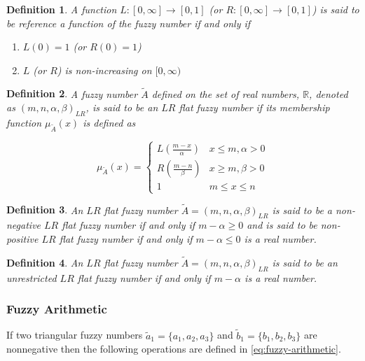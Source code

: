 \documentclass[ee,msthesis]{usuthesis}
\newtheorem{definition}{Definition}[section]
\begin{document}
\begin{definition}
A function \(L:[0,\infty] \rightarrow [0,1]\) (or \(R:[0,\infty] \rightarrow [0,1]\)) is said to be reference a function of the fuzzy number if and only
if

\begin{enumerate}
\item \(L(0) = 1\) (or \(R(0) = 1\))
\item \(L\) (or \(R\)) is non-increasing on \([0,\infty)\)
\end{enumerate}
\end{definition}

\begin{definition}
A fuzzy number \(\tilde{A}\) defined on the set of real numbers, \(\mathbb{R}\), denoted as \((m,n,\alpha,\beta)_{LR}\), is said to be an \(LR\)
flat fuzzy number if its membership function \(\mu_{\tilde{A}}(x)\) is defined as

\begin{equation}
\mu_{\tilde{A}}(x) =
\begin{cases}
L(\frac{m-x}{\alpha}) & x \le m, \alpha > 0 \\
R(\frac{m-n}{\beta}) & x \ge m, \beta > 0 \\
1                & m \le x \le n
\end{cases}
\end{equation}
\end{definition}

\begin{definition}
An \(LR\) flat fuzzy number \(\tilde{A} = (m,n,\alpha,\beta)_{LR}\) is said to be a non-negative \(LR\) flat fuzzy number if and only
if \(m-\alpha \ge 0\) and is said to be non-positive \(LR\) flat fuzzy number if and only if \(m - \alpha \le 0\) is a real number.
\end{definition}

\begin{definition}
An \(LR\) flat fuzzy number \(\tilde{A} = (m,n,\alpha,\beta)_{LR}\) is said to be an unrestricted \(LR\) flat fuzzy number if and only
if \(m - \alpha\) is a real number.
\end{definition}

\subsubsection{Fuzzy Arithmetic}
\label{sec:org6bd6426}
If two triangular fuzzy numbers \(\tilde{a}_1 = \{a_1, a_2, a_3\}\) and \(\tilde{b}_1 = \{b_1, b_2, b_3\}\) are nonnegative
then the following operations are defined in \ref{eq:fuzzy-arithmetic}.
\end{document}
